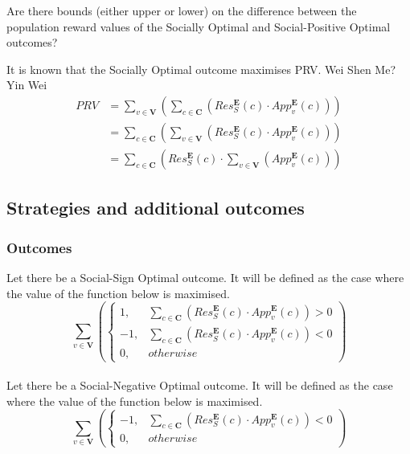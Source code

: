 \documentclass{article}
\begin{document}
Are there bounds (either upper or lower) on the difference between the population reward values of the Socially Optimal and Social-Positive Optimal outcomes?

It is known that the Socially Optimal outcome maximises PRV. Wei Shen Me? Yin Wei
\begin{equation}
\begin{aligned}
PRV
&= \sum^{}_{v \in \boldsymbol{V}}{\left(\sum^{}_{c \in \boldsymbol{C}}{\left(Res^{\boldsymbol{E}}_{S}(c) \cdot App^{\boldsymbol{E}}_{v}(c)\right)}\right)}\\
&= \sum^{}_{c \in \boldsymbol{C}}{\left(\sum^{}_{v \in \boldsymbol{V}}{\left(Res^{\boldsymbol{E}}_{S}(c) \cdot App^{\boldsymbol{E}}_{v}(c)\right)}\right)}\\
&= \sum^{}_{c \in \boldsymbol{C}}{\left(Res^{\boldsymbol{E}}_{S}(c) \cdot \sum^{}_{v \in \boldsymbol{V}}{\left(App^{\boldsymbol{E}}_{v}(c)\right)}\right)}
\end{aligned}
\end{equation}


\subsection{Strategies and additional outcomes}

\subsubsection{Outcomes}

Let there be a Social-Sign Optimal outcome. It will be defined as the case where the value of the function below is maximised.
\begin{equation}
\sum^{}_{v \in \boldsymbol{V}}{\left(
\begin{cases}
1, & \sum^{}_{c \in \boldsymbol{C}}{(Res^{\boldsymbol{E}}_{S}(c) \cdot App^{\boldsymbol{E}}_{v}(c))} > 0\\
-1, & \sum^{}_{c \in \boldsymbol{C}}{(Res^{\boldsymbol{E}}_{S}(c) \cdot App^{\boldsymbol{E}}_{v}(c))} < 0\\
0, & {otherwise}
\end{cases}
\right)}
\end{equation}\\

Let there be a Social-Negative Optimal outcome. It will be defined as the case where the value of the function below is maximised.
\begin{equation}
\sum^{}_{v \in \boldsymbol{V}}{\left(
\begin{cases}
-1, & \sum^{}_{c \in \boldsymbol{C}}{(Res^{\boldsymbol{E}}_{S}(c) \cdot App^{\boldsymbol{E}}_{v}(c))} < 0\\
0, & {otherwise}
\end{cases}
\right)}
\end{equation}\\
\end{document}
